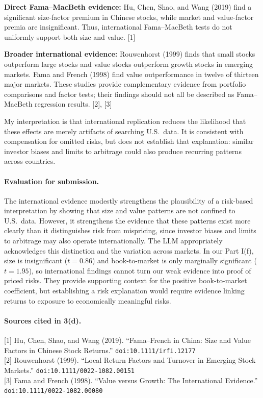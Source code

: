 \begin{tight}
\item \textbf{Direct Fama--MacBeth evidence:} Hu, Chen, Shao, and Wang (2019)
find a significant size-factor premium in Chinese stocks, while market and
value-factor premia are insignificant. Thus, international Fama--MacBeth tests
do not uniformly support both size and value. [1]
\item \textbf{Broader international evidence:} Rouwenhorst (1999) finds that
small stocks outperform large stocks and value stocks outperform growth stocks
in emerging markets. Fama and French (1998) find value outperformance in twelve
of thirteen major markets. These studies provide complementary evidence from
portfolio comparisons and factor tests; their findings should not all be
described as Fama--MacBeth regression results. [2], [3]
\end{tight}

My interpretation is that international replication reduces the likelihood that
these effects are merely artifacts of searching U.S.\ data. It is consistent
with compensation for omitted risks, but does not establish that explanation:
similar investor biases and limits to arbitrage could also produce recurring
patterns across countries.

\paragraph{Evaluation for submission.} The international evidence modestly
strengthens the plausibility of a risk-based interpretation by showing that size
and value patterns are not confined to U.S.\ data. However, it strengthens the
evidence that these patterns exist more clearly than it distinguishes risk from
mispricing, since investor biases and limits to arbitrage may also operate
internationally. The LLM appropriately acknowledges this distinction and the
variation across markets. In our Part I(f), size is insignificant ($t = 0.86$)
and book-to-market is only marginally significant ($t = 1.95$), so
international findings cannot turn our weak evidence into proof of priced
risks. They provide supporting context for the positive book-to-market
coefficient, but establishing a risk explanation would require evidence linking
returns to exposure to economically meaningful risks.

\paragraph{Sources cited in 3(d).}
\begin{sloppypar}\raggedright
[1] Hu, Chen, Shao, and Wang (2019). ``Fama--French in China: Size and Value
Factors in Chinese Stock Returns.'' \texttt{doi:10.1111/irfi.12177}\\
{[2]} Rouwenhorst (1999). ``Local Return Factors and Turnover in Emerging Stock
Markets.'' \texttt{doi:10.1111/0022-1082.00151}\\
{[3]} Fama and French (1998). ``Value versus Growth: The International
Evidence.'' \texttt{doi:10.1111/0022-1082.00080}
\end{sloppypar}

